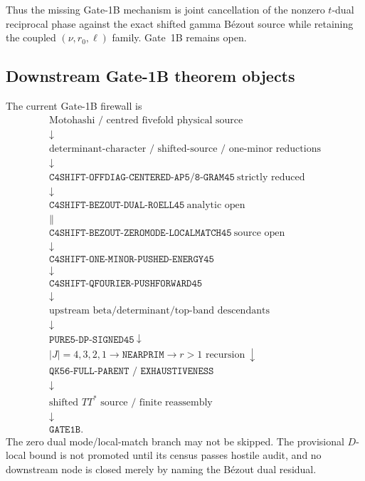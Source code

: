 \documentclass[11pt]{article}
\theoremstyle{definition}
\newcommand{\1}{\mathbf 1}
\begin{document}
Thus the missing Gate-1B mechanism is joint cancellation of the nonzero $t$-dual
reciprocal phase against the exact shifted gamma B\'ezout source while retaining the
coupled $(\nu,r_0,\ell)$ family.  Gate~1B remains open.

\subsection{Downstream Gate-1B theorem objects}

The current Gate-1B firewall is
\[
\boxed{
\begin{array}{c}
\text{Motohashi / centred fivefold physical source}\\
\downarrow\\
\text{determinant-character / shifted-source / one-minor reductions}\\
\downarrow\\
\texttt{C4SHIFT-OFFDIAG-CENTERED-AP5/8-GRAM45}\ \text{strictly reduced}\\
\downarrow\\
\boxed{\texttt{C4SHIFT-BEZOUT-DUAL-R0ELL45}}\ \text{analytic open}\\
\parallel\\
\texttt{C4SHIFT-BEZOUT-ZEROMODE-LOCALMATCH45}\ \text{source open}\\
\downarrow\\
\texttt{C4SHIFT-ONE-MINOR-PUSHED-ENERGY45}\\
\downarrow\\
\texttt{C4SHIFT-QFOURIER-PUSHFORWARD45}\\
\downarrow\\
\text{upstream beta/determinant/top-band descendants}\\
\downarrow\\
\texttt{PURE5-DP-SIGNED45}\
\downarrow\\
|J|=4,3,2,1\to\texttt{NEARPRIM}\to r>1\text{ recursion}\
\downarrow\\
\texttt{QK56-FULL-PARENT / EXHAUSTIVENESS}\\
\downarrow\\
\text{shifted }TT^\ast\text{ source / finite reassembly}\\
\downarrow\\
\texttt{GATE1B}.
\end{array}}
\]
The zero dual mode/local-match branch may not be skipped.  The provisional $D$-local
bound is not promoted until its census passes hostile audit, and no downstream node is
closed merely by naming the B\'ezout dual residual.
\end{document}

